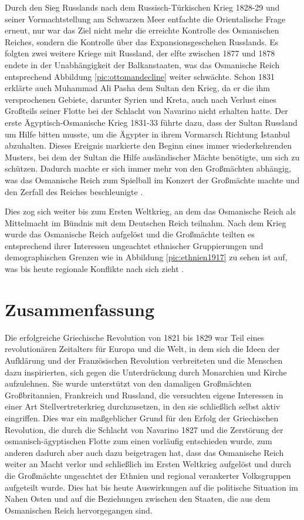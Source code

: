 \documentclass[preprint]{geomorphica} %
\begin{document}
Durch den Sieg Russlands nach dem Russisch-Türkischen Krieg 1828-29 und seiner Vormachtstellung am Schwarzen Meer entfachte die Orientalische Frage erneut, nur war das Ziel nicht mehr die erreichte Kontrolle des Osmanischen Reiches, sondern die Kontrolle über das Expansionsgeschehen Russlands.
Es folgten zwei weitere Kriege mit Russland, der elfte zwischen 1877 und 1878 endete in der Unabhängigkeit der Balkanstaaten, was das Osmanische Reich entsprechend Abbildung \ref{pic:ottomandecline} weiter schwächte.
Schon 1831 erklärte auch Muhammad Ali Pasha dem Sultan den Krieg, da er die ihm versprochenen Gebiete, darunter Syrien und Kreta, auch nach Verlust eines Großteils seiner Flotte bei der Schlacht von Navarino nicht erhalten hatte.
Der erste Ägyptisch-Osmanische Krieg 1831-33 führte dazu, dass der Sultan Russland um Hilfe bitten musste, um die Ägypter in ihrem Vormarsch Richtung Istanbul abzuhalten.
Dieses Ereignis markierte den Beginn eines immer wiederkehrenden Musters, bei dem der Sultan die Hilfe ausländischer Mächte benötigte, um sich zu schützen.
Dadurch machte er sich immer mehr von den Großmächten abhängig, was das Osmanische Reich zum Spielball im Konzert der Großmächte machte und den Zerfall des Reiches beschleunigte \cite{Karsh2007}.

Dies zog sich weiter bis zum Ersten Weltkrieg, an dem das Osmanische Reich als Mittelmacht im Bündnis mit dem Deutschen Reich teilnahm.
Nach dem Krieg wurde das Osmanische Reich aufgelöst und die Großmächte teilten es entsprechend ihrer Interessen ungeachtet ethnischer Gruppierungen und demographischen Grenzen wie in Abbildung \ref{pic:ethnien1917} zu sehen ist auf, was bis heute regionale Konflikte nach sich zieht \cite{Finkel2007, Kinross1979, Jorga1990, Anderson1966, Karsh2007}.


\section{Zusammenfassung}

Die erfolgreiche Griechische Revolution von 1821 bis 1829 war Teil eines revolutionären Zeitalters für Europa und die Welt, in dem sich die Ideen der Aufklärung und der Französischen Revolution verbreiteten und die Menschen dazu inspirierten, sich gegen die Unterdrückung durch Monarchien und Kirche aufzulehnen.
Sie wurde unterstützt von den damaligen Großmächten Großbritannien, Frankreich und Russland, die versuchten eigene Interessen in einer Art Stellvertreterkrieg durchzusetzen, in den sie schließlich selbst aktiv eingriffen.
Dies war ein maßgeblicher Grund für den Erfolg der Griechischen Revolution, die durch die Schlacht von Navarino 1827 und die Zerstörung der osmanisch-ägyptischen Flotte zum einen vorläufig entschieden wurde, zum anderen dadurch aber auch dazu beigetragen hat, dass das Osmanische Reich weiter an Macht verlor und schließlich im Ersten Weltkrieg aufgelöst und durch die Großmächte ungeachtet der Ethnien und regional verankerter Volksgruppen aufgeteilt wurde.
Dies hat bis heute Auswirkungen auf die politische Situation im Nahen Osten und auf die Beziehungen zwischen den Staaten, die aus dem Osmanischen Reich hervorgegangen sind.
\end{document}

